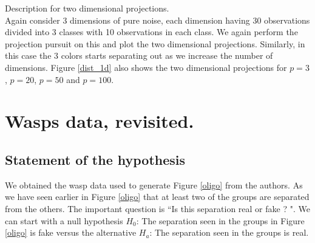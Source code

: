 \documentclass[12]{article}
\begin{document}
{\color{red} Description for two dimensional projections.} \\
Again consider 3 dimensions of pure noise, each dimension having 30 observations divided into 3 classes with 10 observations in each class. We again perform the projection pursuit on this and plot the two dimensional projections. Similarly, in this case the 3 colors starts separating out as we increase the number of dimensions.  Figure \ref{dist_1d} also shows the two dimensional projections for $p=3$, $p=20$, $p=50$ and $p=100$.






\section{Wasps data, revisited. }

\subsection{Statement of the hypothesis}

We obtained the wasp data used to generate Figure \ref{oligo} from the authors.  As we have seen earlier in Figure \ref{oligo} that at least two of the groups are separated from the others.  The important question is ``Is this separation real or fake ? ". We can start with a null hypothesis $H_0$: The separation seen in the groups in Figure \ref{oligo} is fake versus the alternative $H_a$: The separation seen in the groups is real. 
\end{document}
